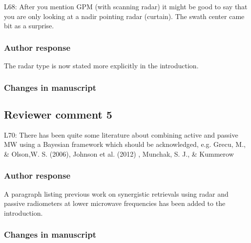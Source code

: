 L68:  After you mention GPM (with scanning radar) it might be good to say that you are only looking at a nadir pointing radar (curtain).  The swath center came bit as a surprise.

\subsubsection*{Author response}

The radar type is now stated more explicitly in the introduction.

\subsubsection*{Changes in manuscript}

\begin{change}[75]
\DIFaddbegin {}\DIFaddend
\end{change}
%

\subsection*{Reviewer comment 5}

L70: There has been quite some literature about combining active and passive
MW using a Bayesian framework which should be acknowledged, e.g. Grecu, M., \&
Olson,W. S. (2006), Johnson et al. (2012) , Munchak, S. J., \& Kummerow

\subsubsection*{Author response}

A paragraph listing previous work on synergistic retrievals using radar and
passive radiometers at lower microwave frequencies has been added to the
introduction.

\subsubsection*{Changes in manuscript}

